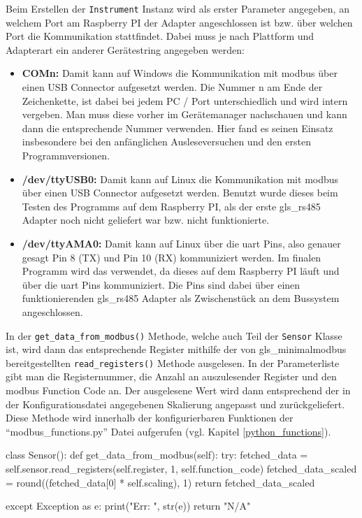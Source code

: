 Beim Erstellen der \lstinline{Instrument} Instanz wird als erster Parameter angegeben, an welchem Port am Raspberry PI der Adapter angeschlossen ist bzw. über welchen Port die Kommunikation stattfindet. Dabei muss je nach Plattform und Adapterart ein anderer Gerätestring angegeben werden:
\begin{itemize}
\item \textbf{COMn:} Damit kann auf Windows die Kommunikation mit \gls{modbus} über einen USB Connector aufgesetzt werden. Die Nummer n am Ende der Zeichenkette, ist dabei bei jedem PC / Port unterschiedlich und wird intern vergeben. Man muss diese vorher im Gerätemanager nachschauen und kann dann die entsprechende Nummer verwenden. Hier fand es seinen Einsatz insbesondere bei den anfänglichen Ausleseversuchen und den ersten Programmversionen.
\item \textbf{/dev/ttyUSB0:} Damit kann auf Linux die Kommunikation mit \gls{modbus} über einen USB Connector aufgesetzt werden. Benutzt wurde dieses beim Testen des Programms auf dem Raspberry PI, als der erste \gls{gls_rs485} Adapter noch nicht geliefert war bzw. nicht funktionierte.
\item \textbf{/dev/ttyAMA0:} Damit kann auf Linux über die \ac{uart} Pins, also genauer gesagt Pin 8 (TX) und Pin 10 (RX) kommuniziert werden. Im finalen Programm wird das verwendet, da dieses auf dem Raspberry PI läuft und über die \ac{uart} Pins kommuniziert. Die Pins sind dabei über einen funktionierenden \gls{gls_rs485} Adapter als Zwischenstück an dem Bussystem angeschlossen.
\end{itemize}

\vfill

\label{get_data_from_modbus}
In der \lstinline{get_data_from_modbus()} Methode, welche auch Teil der \lstinline{Sensor} Klasse ist, wird dann das entsprechende Register mithilfe der von \gls{gls_minimalmodbus} bereitgestellten \lstinline{read_registers()} Methode ausgelesen. In der Parameterliste gibt man die Registernummer, die Anzahl an auszulesender Register und den \gls{modbus} Function Code an. Der ausgelesene Wert wird dann entsprechend der in der Konfigurationsdatei angegebenen Skalierung angepasst und zurückgeliefert. Diese Methode wird innerhalb der konfigurierbaren Funktionen der \enquote{modbus\_functions.py} Datei aufgerufen (vgl. Kapitel \ref{python_functions}).

\begin{pythoncode}
class Sensor():
	def get_data_from_modbus(self):
		try:
			fetched_data = self.sensor.read_registers(self.register, 1, self.function_code)
			fetched_data_scaled = round((fetched_data[0] * self.scaling), 1)
			return fetched_data_scaled
		
		except Exception as e:
			print("Err: ", str(e))
			return "N/A"
\end{pythoncode}

